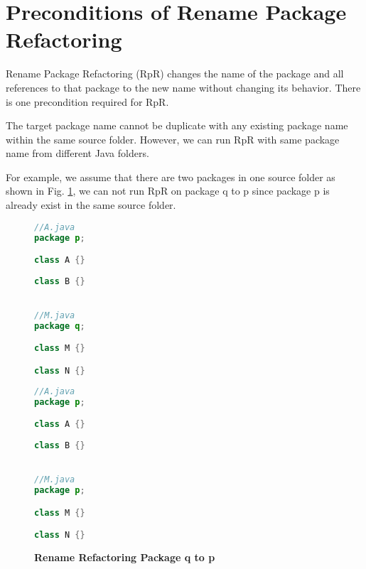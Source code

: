 \section{\textbf{Preconditions of Rename Package Refactoring}}
Rename Package Refactoring (RpR) changes the name of the package and all references to that package to the new name without changing its behavior. There is one precondition required for RpR.

The target package name cannot be duplicate with any existing package name within the same source folder. However, we can run RpR with same package name from different Java folders.

For example, we assume that there are two packages in one source folder as shown in Fig. \ref{fig:RpR}, we can not run RpR on package q to p since package p is already exist in the same source folder. 

\begin{figure}[th]
\centering
\begin{minipage}[t]{0.45\linewidth}
\begin{lstlisting}[language=java, basicstyle=\scriptsize\ttfamily,frame=single]
//A.java
package p;

class A {}
	
class B {}


//M.java
package q;

class M {}	

class N {}
\end{lstlisting}
\end{minipage}
\hfill
\begin{minipage}[t]{0.45\linewidth}
\begin{lstlisting}[language=java, basicstyle=\scriptsize\ttfamily,frame=single]
//A.java
package p;

class A {}
	
class B {}


//M.java
package p;

class M {}	

class N {}


\end{lstlisting}
\end{minipage}
\caption{\textbf{Rename Refactoring Package q to p}}
\label{fig:RpR}
\end{figure}